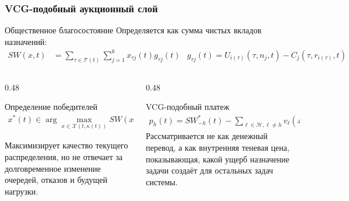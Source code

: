\begin{frame}
	\frametitle{VCG-подобный аукционный слой}
	\small
	\begin{block}{Общественное благосостояние}
		Определяется как сумма чистых вкладов назначений:
		\begin{align*}
			SW(x,t)&=\sum_{\tau\in\mathcal{T}(t)}\sum_{j=1}^{k}x_{\tau j}(t)g_{\tau j}(t) & g_{\tau j}(t)=U_{i(\tau)}(\tau,n_j,t)-C_j(\tau,r_{i(\tau)},t)
		\end{align*}
	\end{block}
	\begin{columns}[T,onlytextwidth]
		\begin{column}{0.48\textwidth}
			\begin{block}{Определение победителей}
				\begin{align*}
					x^*(t)\in\arg\max_{x\in\mathcal{X}(t,\kappa(t))}SW(x,t).
				\end{align*}
			\end{block}
			Максимизирует качество текущего распределения, но не отвечает за долговременное изменение очередей, отказов и будущей нагрузки.
		\end{column}
		\begin{column}{0.48\textwidth}
			\begin{block}{VCG-подобный платеж}
				\begin{align*}
					p_h(t)=SW^*_{-h}(t)-\sum_{\ell\in\mathcal{H},\ell\neq h}v_{\ell}(x^*(t),t).
				\end{align*}
				Рассматривается не как денежный перевод, а как внутренняя теневая цена, показывающая, какой ущерб назначение задачи создаёт для остальных задач системы.
			\end{block}
		\end{column}
	\end{columns}
\end{frame}

